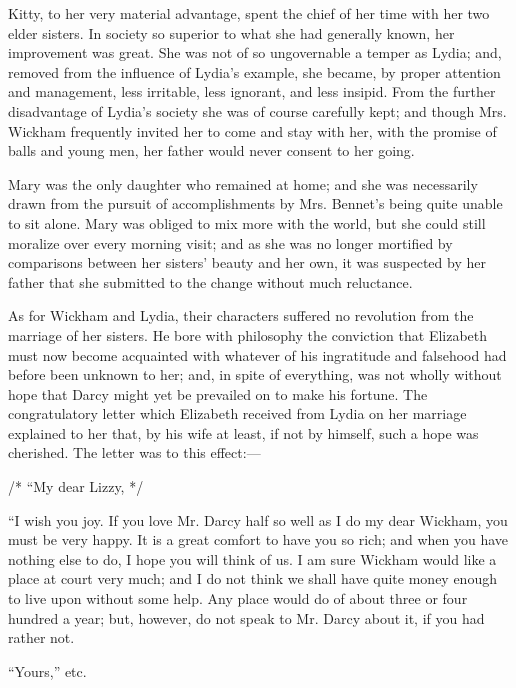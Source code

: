 Kitty, to her very material advantage, spent the chief of her time with her two elder sisters. In society so superior to what she had generally known, her improvement was great. She was not of so ungovernable a temper as Lydia; and, removed from the influence of Lydia's example, she became, by proper attention and management, less irritable, less ignorant, and less insipid. From the further disadvantage of Lydia's society she was of course carefully kept; and though Mrs. Wickham frequently invited her to come and stay with her, with the promise of balls and young men, her father would never consent to her going.

Mary was the only daughter who remained at home; and she was necessarily drawn from the pursuit of accomplishments by Mrs. Bennet's being quite unable to sit alone. Mary was obliged to mix more with the world, but she could still moralize over every morning visit; and as she was no longer mortified by comparisons between her sisters' beauty and her own, it was suspected by her father that she submitted to the change without much reluctance.

As for Wickham and Lydia, their characters suffered no revolution from the marriage of her sisters. He bore with philosophy the conviction that Elizabeth must now become acquainted with whatever of his ingratitude and falsehood had before been unknown to her; and, in spite of everything, was not wholly without hope that Darcy might yet be prevailed on to make his fortune. The congratulatory letter which Elizabeth received from Lydia on her marriage explained to her that, by his wife at least, if not by himself, such a hope was cherished. The letter was to this effect:---

/* ``My dear Lizzy, */

``I wish you joy. If you love Mr. Darcy half so well as I do my dear Wickham, you must be very happy. It is a great comfort to have you so rich; and when you have nothing else to do, I hope you will think of us. I am sure Wickham would like a place at court very much; and I do not think we shall have quite money enough to live upon without some help. Any place would do of about three or four hundred a year; but, however, do not speak to Mr. Darcy about it, if you had rather not.

``Yours,'' etc.

